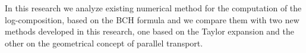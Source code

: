 In this research we analyze existing numerical method for the computation of the log-composition, based on the BCH formula and we compare them with two new methods developed in this research, one based on the Taylor expansion and the other on the geometrical concept of parallel transport. 

 





%	
%	
